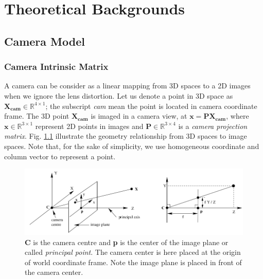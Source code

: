 
\chapter{Theoretical Backgrounds}\label{chapter:theoratical-background}
\section{Camera Model}
\subsection{Camera Intrinsic Matrix}
A camera can be consider as a linear mapping from 3D spaces to a 2D images when we ignore the lens distortion. Let us denote a point in 3D space as $\mathbf{X_{cam}} \in \mathbb{R}^{4\times1}$; the subscript \textit{cam} mean the point is located in camera coordinate frame. The 3D point $\mathbf{X_{cam}}$ is imaged in a camera view, at $\mathbf{x = PX_{cam}}$, where $\mathbf{x} \in \mathbb{R}^{3\times1}$ represent 2D points in images and $\mathbf{P} \in \mathbb{R}^{3\times4}$ is a \textit{camera projection matrix}. Fig. \ref{fig:ch1-pinhole-camera-geometry} \cite{book:multivew-geometry} illustrate the geometry relationship from 3D spaces to image spaces. Note that, for the sake of simplicity, we use homogeneous coordinate and column vector to represent a point.

\begin{figure}[htpb]
	\centering
	\includegraphics[width=0.7\columnwidth]{figures/ch1/pinhole-camera-geometry}
	\caption{\textbf{C} is the camera centre and \textbf{p} is the center of the image plane or called \textit{principal point}. The camera
		center is here placed at the origin of world coordinate frame. Note the image plane is placed in front of the camera center.}
	\label{fig:ch1-pinhole-camera-geometry}
\end{figure}

